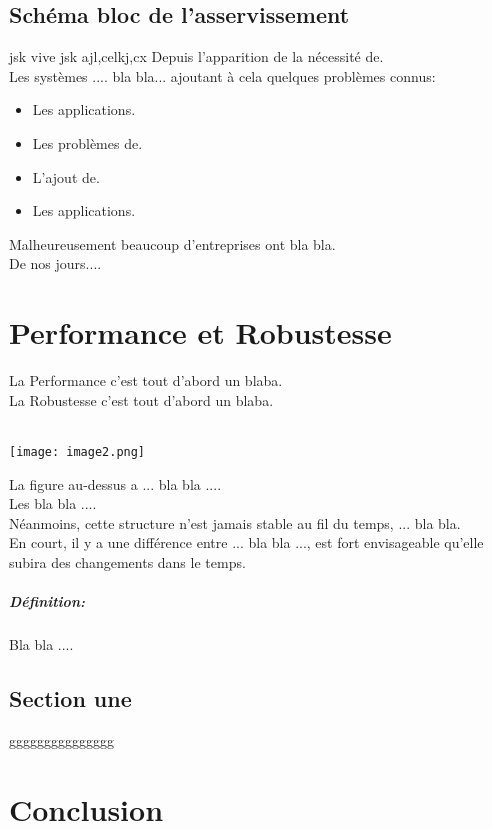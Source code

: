 \documentclass[12pt, a4paper, openany]{report}
\begin{document}
\section{Schéma bloc de l'asservissement} 
 	jsk vive jsk  ajl,celkj,cx   
   Depuis l’apparition de la nécessité de. \\
   
   Les systèmes .... bla bla... ajoutant à cela quelques problèmes connus:
   
    \begin{itemize}[label=$\square$]
      \item  Les applications.
      \item  Les problèmes de. 
      \item  L'ajout de.
      \item  Les applications.
  \end{itemize}
  
   Malheureusement beaucoup d'entreprises ont bla bla. \\
   
   De nos jours....
   
   
\chapter{Performance et Robustesse}
 La Performance c’est tout d’abord un blaba.\\
 
 La Robustesse c’est tout d’abord un blaba.\\ \\
 \begin{center}
   \texttt{[image: image2.png]}
   \label{fig1}
 \end{center}
 
 La figure au-dessus a ... bla bla ....\\
 
 Les bla bla ....\\
 
 Néanmoins, cette structure n’est jamais stable au fil du temps, ... bla bla.\\
  
 En court, il y a une différence entre ... bla bla ..., est fort envisageable qu’elle subira des changements dans le temps.
 
 \paragraph{Définition:}
  Bla bla ....

 \section{Section une}
  ggggggggggggggg



\chapter*{Conclusion}
\end{document}
